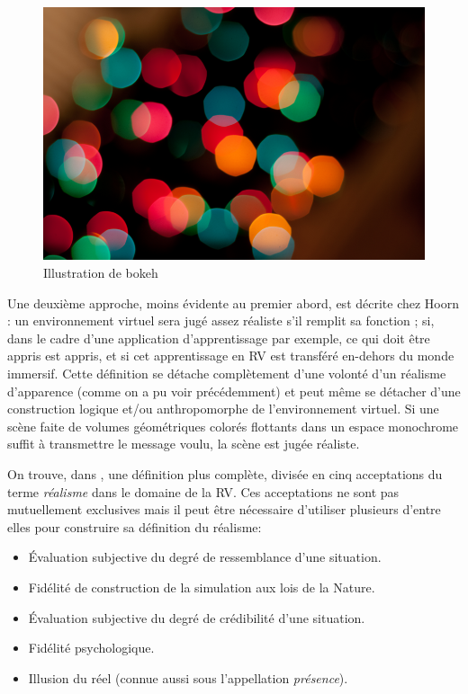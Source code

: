 	\begin{figure}
		\centering
		\includegraphics[scale=.75]{Figures/BokehIllustration}
		\caption{Illustration de bokeh}
		\label{fig:bokeh_illustration}
	\end{figure}
	
	\par Une deuxième approche, moins évidente au premier abord, est décrite chez Hoorn \citep{hoorn_virtual_2003}: un environnement virtuel sera jugé assez réaliste s'il remplit sa fonction ; si, dans le cadre d'une application d'apprentissage par exemple, ce qui doit être appris est appris, et si cet apprentissage en RV est transféré en-dehors du monde immersif. Cette définition se détache complètement d'une volonté d'un réalisme d'apparence (comme on a pu voir précédemment) et peut même se détacher d'une construction logique et/ou anthropomorphe de l'environnement virtuel. Si une scène faite de volumes géométriques colorés flottants dans un espace monochrome suffit à transmettre le message voulu, la scène est jugée réaliste.
	
	\par On trouve, dans \citep{fuchs_traite_2003}, une définition plus complète, divisée en cinq acceptations du terme \textit{réalisme} dans le domaine de la RV. Ces acceptations ne sont pas mutuellement exclusives mais il peut être nécessaire d'utiliser plusieurs d'entre elles pour construire sa définition du réalisme:
	\begin{itemize}
		\item Évaluation subjective du degré de ressemblance d'une situation.
		\item Fidélité de construction de la simulation aux lois de la Nature.
		\item Évaluation subjective du degré de crédibilité d'une situation.
		\item Fidélité psychologique.
		\item Illusion du réel (connue aussi sous l'appellation \textit{présence}).
	\end{itemize}
	
